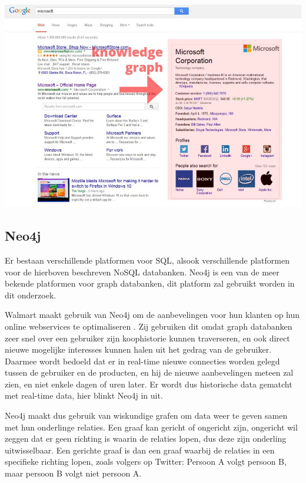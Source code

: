 \includegraphics[width=\linewidth]{img/Google_Knowledge_Graph.jpeg}


\subsection{Neo4j}
\label{sec:Neo4j}

Er bestaan verschillende platformen voor SQL, alsook verschillende platformen voor de hierboven beschreven NoSQL databanken. Neo4j is een van de meer bekende platformen voor graph databanken, dit platform zal gebruikt worden in dit onderzoek.

Walmart maakt gebruik van Neo4j om de aanbevelingen voor hun klanten op hun online webservices te optimaliseren \autocite{neo4jWalmart2014}. Zij gebruiken dit omdat graph databanken zeer snel over een gebruiker zijn koophistorie kunnen traverseren, en ook direct nieuwe mogelijke interesses kunnen halen uit het gedrag van de gebruiker. Daarmee wordt bedoeld dat er in real-time nieuwe connecties worden gelegd tussen de gebruiker en de producten, en hij de nieuwe aanbevelingen meteen zal zien, en niet enkele dagen of uren later. Er wordt dus historische data gematcht met real-time data, hier blinkt Neo4j in uit. 

Neo4j maakt dus gebruik van wiskundige grafen om data weer te geven samen met hun onderlinge relaties. Een graaf kan gericht of ongericht zijn, ongericht wil zeggen dat er geen richting is waarin de relaties lopen, dus deze zijn onderling uitwisselbaar. Een gerichte graaf is dan een graaf waarbij de relaties in een specifieke richting lopen, zoals volgers op Twitter: Persoon A volgt persoon B, maar persoon B volgt niet persoon A.

